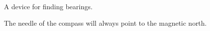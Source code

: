 A device for finding bearings.   
\par
The needle of the compass will always point to the magnetic north.